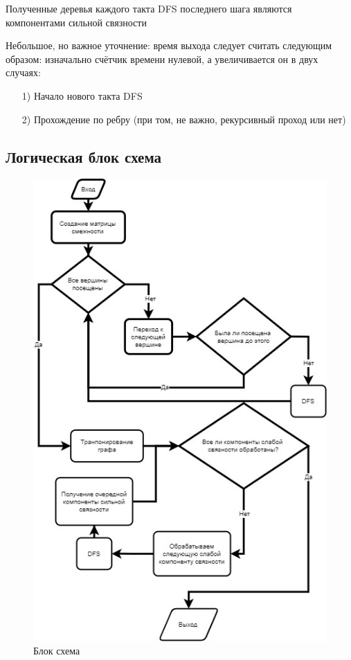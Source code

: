 Полученные деревья каждого такта DFS последнего шага являются компонентами сильной связности

Небольшое, но важное уточнение: время выхода следует считать следующим образом: изначально счётчик времени нулевой, а увеличивается он в двух случаях:

\begin{enumerate}
    \item [1)] Начало нового такта DFS
    \item [2)] Прохождение по ребру (при том, не важно, рекурсивный проход или нет)
\end{enumerate}
\newpage
\subsection{Логическая блок схема}
\begin{figure}[!htb]
\centering
\includegraphics[scale = 0.9]{Images/graph16.jpg}
\caption{Блок схема}
\label{fig:image10}
\end{figure}

